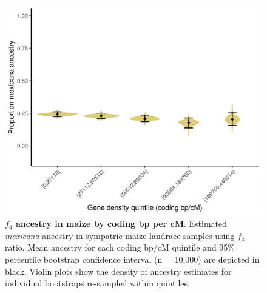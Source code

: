 \begin{figure}[ht]
\includegraphics[width=\textwidth]{chapter2/figures/f4_sympatric_maize_pop22_bycd5.png}
\caption{\color{Gray} \textbf{$f_4$ ancestry in maize by coding bp per cM}. Estimated \textit{mexicana} ancestry in sympatric maize landrace samples using $f_4$ ratio. Mean ancestry for each coding bp/cM quintile and 95\% percentile bootstrap confidence interval (n = 10,000) are depicted in black. Violin plots show the density of ancestry estimates for individual bootstraps re-sampled within quintiles.}
\label{f4_maize_by_cd}
\end{figure}


